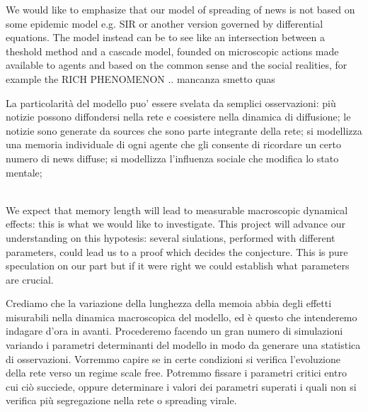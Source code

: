 We would like to emphasize that our model of spreading of news is not based on some epidemic model
 e.g. SIR or another version governed by differential equations. The model instead can be to see like an 
 intersection between a theshold method and a cascade model, founded on microscopic actions made available to agents 
  and based on the common sense and the social realities, for example the RICH PHENOMENON .. mancanza smetto quas


La particolarità del modello puo' essere svelata da semplici osservazioni: più notizie possono diffondersi nella rete e coesistere nella
 dinamica di diffusione; le notizie sono generate da sources che sono parte integrante della rete; si modellizza una memoria individuale
 di ogni agente che gli consente di ricordare un certo numero di news diffuse; si modellizza l'influenza sociale che modifica lo stato mentale;

 \\
 We expect that memory length will lead to measurable macroscopic
 dynamical effects: this is what we would like to investigate.
 This project will advance our understanding on this hypotesis:
 several siulations, performed with different parameters, could lead
 us to a proof which decides the conjecture.
 This is pure speculation on our part but if it were right we could
 establish what parameters are crucial.
 

Crediamo che la variazione della lunghezza della memoia abbia degli effetti misurabili nella dinamica macroscopica del modello, 
ed è questo che intenderemo indagare d'ora in avanti. Procederemo facendo un gran numero di simulazioni variando i parametri 
determinanti del modello in modo da generare una statistica di osservazioni.
 Vorremmo capire se in certe condizioni si verifica l'evoluzione della rete verso un regime scale free. Potremmo fissare i parametri
  critici entro cui ciò succiede, oppure determinare i valori dei parametri superati i quali non si verifica più segregazione nella rete o spreading virale. 



